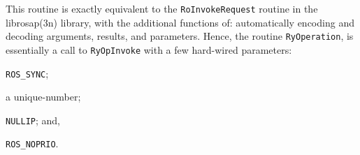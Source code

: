 This routine is exactly equivalent to the \verb"RoInvokeRequest" routine in the
\man librosap(3n) library,
with the additional functions of:
automatically encoding and decoding arguments, results, and parameters.
Hence,
the routine \verb"RyOperation",
is essentially a call to \verb"RyOpInvoke" with a few hard-wired parameters:
\begin{describe}
\item[\verb"class":]  \verb"ROS_SYNC";

\item[\verb"invokeID":] a unique-number;

\item[\verb"linkedID":] \verb"NULLIP";
and,

\item[\verb"priority":] \verb"ROS_NOPRIO".
\end{describe}

